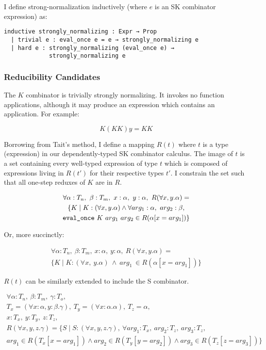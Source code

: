 \documentclass[11pt]{article}
\begin{document}
I define strong-normalization inductively (where \(e\) is an SK combinator expression) as:

\begin{verbatim}
inductive strongly_normalizing : Expr → Prop
  | trivial e : eval_once e = e → strongly_normalizing e
  | hard e : strongly_normalizing (eval_once e) →
             strongly_normalizing e
\end{verbatim}
\subsubsection{Reducibility Candidates}
\label{sec:org90230ad}

The \(K\) combinator is trivially strongly normalizing. It invokes no function applications, although it may produce an expression which contains an application. For example:

\[
K (KK) y = KK
\]

Borrowing from Tait's method, I define a mapping \(R(t)\) where \(t\) is a type (expression) in our dependently-typed SK combinator calculus. The image of \(t\) is a set containing every well-typed expression of type \(t\) which is composed of expressions living in \(R(t')\) for their respective types \(t'\). I constrain the set such that all one-step reduxes of \(K\) are in \(R\).

\begin{gather*}
\forall \alpha : T_{n},\ \beta : T_{m},\ x : \alpha,\ y : \alpha,\ R(\forall x, y.\alpha) = \\
\{ K \mid  K : (\forall x, y.\alpha) \land \forall arg_{1} : \alpha,\ arg_{2} : \beta, \\
\text{\texttt{eval\_once}}\ K\  arg_{1}\  arg_{2} \in R(\alpha[x = arg_{1}]) \}
\end{gather*}

Or, more succinctly:

\begin{gather*}
\forall \alpha : T_{n},\ \beta : T_{m},\ x : \alpha,\ y : \alpha,\ R(\forall x, y.\alpha) = \\
\{ K \mid K : (\forall x,\ y.\alpha)\ \land\  arg_{1}\ \in R(\alpha[x = arg_{1}]) \}
\end{gather*}

\(R(t)\) can be similarly extended to include the S combinator.

\begin{gather*}
\forall \alpha : T_{n},\ \beta : T_{m},\ \gamma : T_{o},\ \\
T_{x} = (\forall x : \alpha, y : \beta.\gamma),\ T_{y} = (\forall x : \alpha.\alpha),\ T_{z} = \alpha,\ \\
x : T_{x},\ y : T_{y},\ z : T_{z}, \\
R(\forall x, y, z.\gamma) = \{ S \mid
  S : (\forall x, y, z.\gamma),\ \forall arg_{1} : T_{x},\ arg_{2} : T_{z},\ arg_{3} : T_{z}, \\
  arg_{1} \in R(T_{x}[x = arg_{1}]) \land arg_{2} \in R(T_{y}[y = arg_{2}]) \land arg_{3} \in R(T_{z}[z = arg_{3}]) \}
\end{gather*}
\end{document}
